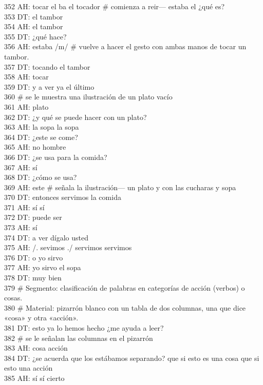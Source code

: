 352 AH: tocar el ba el tocador \# comienza a reir--- estaba el ¿qué es?\\
353 DT: el tambor\\
354 AH: el tambor\\
355 DT: ¿qué hace?\\
356 AH: estaba /m/ \# vuelve a hacer el gesto con ambas manos de tocar un tambor.\\
357 DT: tocando el tambor\\
358 AH: tocar\\
359 DT: y a ver ya el último\\
360 \# se le muestra una ilustración de un plato vacío\\
361 AH: plato\\
362 DT: ¿y qué se puede hacer con un plato?\\
363 AH: la sopa la sopa\\
364 DT: ¿este se come?\\
365 AH: no hombre\\
366 DT: ¿se usa para la comida?\\
367 AH: sí\\
368 DT: ¿cómo se usa?\\
369 AH: este \# señala la ilustración--- un plato y con las cucharas y sopa\\
370 DT: entonces servimos la comida\\
371 AH: sí sí\\
372 DT: puede ser\\
373 AH: sí\\
374 DT: a ver dígalo usted\\
375 AH: /. sevimos ./ servimos servimos\\
376 DT: o yo sirvo\\
377 AH: yo sirvo el sopa\\
378 DT: muy bien\\
379 \# Segmento: clasificación de palabras en categorías de acción (verbos) o cosas.\\
380 \# Material: pizarrón blanco con un tabla de dos columnas, una  que dice «cosa» y otra «acción».\\
381 DT: esto ya lo hemos hecho ¿me ayuda a leer?\\
382 \# se le señalan las columnas en el pizarrón\\
383 AH: cosa acción\\
384 DT: ¿se acuerda que los estábamos separando? que si esto es una cosa que si esto una acción\\
385 AH: sí sí cierto\\
